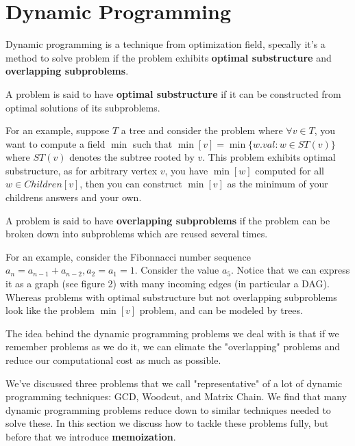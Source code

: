 \section{Dynamic Programming}

Dynamic programming is a technique from optimization field, specally it's a
method to solve problem if the problem exhibits \textbf{optimal substructure}
and \textbf{overlapping subproblems}.

\begin{definition*}

A problem is said to have \textbf{optimal substructure} if it can be constructed
from optimal solutions of its subproblems. 

For an example, suppose $T$ a tree and consider the problem where $\forall v \in
T$, you want to compute a field $\min$ such that $\min[v] = \min\{w.val : w \in
ST(v)\}$ where $ST(v)$ denotes the subtree rooted by $v$. This problem exhibits
optimal substructure, as for arbitrary vertex $v$, you have $\min[w]$ computed
for all $w \in Children[v]$, then you can construct $\min[v]$ as the minimum of
your childrens answers and your own.

\end{definition*}

\begin{definition*}

A problem is said to have \textbf{overlapping subproblems} if the problem can be
broken down into subproblems which are reused several times.

For an example, consider the Fibonnacci number sequence $a_n = a_{n-1} +
a_{n-2}, a_2 = a_1 = 1$. Consider the value $a_5$. Notice that we can express it
as a graph (see figure 2) with many incoming edges (in particular a DAG).
Whereas problems with optimal substructure but not overlapping subproblems look
like the problem $\min[v]$ problem, and can be modeled by trees.

\end{definition*}

The idea behind the dynamic programming problems we deal with is that if we
remember problems as we do it, we can elimate the "overlapping" problems and
reduce our computational cost as much as possible.

We've discussed three problems that we call "representative" of a lot of dynamic
programming techniques: GCD, Woodcut, and Matrix Chain. We find that many
dynamic programming problems reduce down to similar techniques needed to solve
these. In this section we discuss how to tackle these problems fully, but before
that we introduce \textbf{memoization}.

